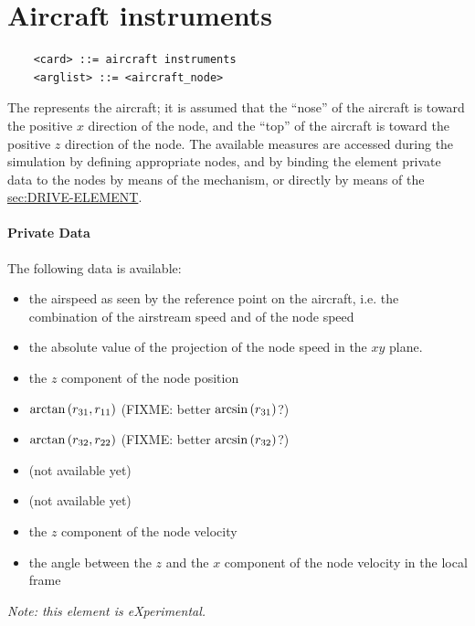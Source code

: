 \section{Aircraft instruments}
\begin{verbatim}
    <card> ::= aircraft instruments
    <arglist> ::= <aircraft_node>
\end{verbatim}
The  represents the aircraft; it is assumed
that the ``nose'' of the aircraft is toward the positive $x$ direction
of the node, and the ``top'' of the aircraft is toward the positive 
$z$ direction of the node.
The available measures are accessed during the simulation 
by defining appropriate  nodes, and by binding
the  element private data to the nodes 
by means of the  mechanism, or directly by means
of the 
\hyperref{\kw{element} drive}{\kw{element} drive (see Section~}{)}{sec:DRIVE-ELEMENT}.

\paragraph{Private Data}
The following data is available:
\begin{itemize}
\item {} the airspeed as seen by the reference 
	point on the aircraft, i.e. the combination 
	of the airstream speed and of the node speed
\item {} the absolute value of the projection
	of the node speed in the $xy$ plane.
\item {} the $z$ component of the node position
\item {} $\arctan\left( r_{31}, r_{11} \right)$
	(FIXME: better $\arcsin\left( r_{31} \right)$?)
\item {} $\arctan\left( r_{32}, r_{22} \right)$
	(FIXME: better $\arcsin\left( r_{32} \right)$?)
\item {} (not available yet)
\item {} (not available yet)
\item {} the $z$ component of the node velocity
\item {} the angle between the $z$ 
	and the $x$ component of the node velocity 
	in the local frame
\end{itemize}

\noindent
\emph{Note: this element is eXperimental.}




